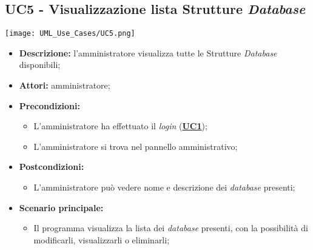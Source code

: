 \subsection{UC5 - Visualizzazione lista Strutture \textit{Database}}
\label{sec:UC5}
\texttt{[image: UML\_Use\_Cases/UC5.png]}
\begin{itemize}
	\item \textbf{Descrizione:} l’amministratore visualizza tutte le Strutture \textit{Database} disponibili;
	\item \textbf{Attori:} amministratore;
	\item \textbf{Precondizioni:} 
	\begin{itemize}
		\item L’amministratore ha effettuato il \textit{login} (\hyperref[sec:UC1]{\textbf{UC1}});
		\item L’amministratore si trova nel pannello amministrativo;
	\end{itemize}
	\item \textbf{Postcondizioni:} 
	\begin{itemize}
		\item L'amministratore può vedere nome e descrizione dei \textit{database} presenti;
	\end{itemize}
	\item \textbf{Scenario principale:} 
	\begin{itemize}
		\item Il programma visualizza la lista dei \textit{database} presenti, con la possibilità di modificarli, visualizzarli o eliminarli;
	\end{itemize}
\end{itemize}

